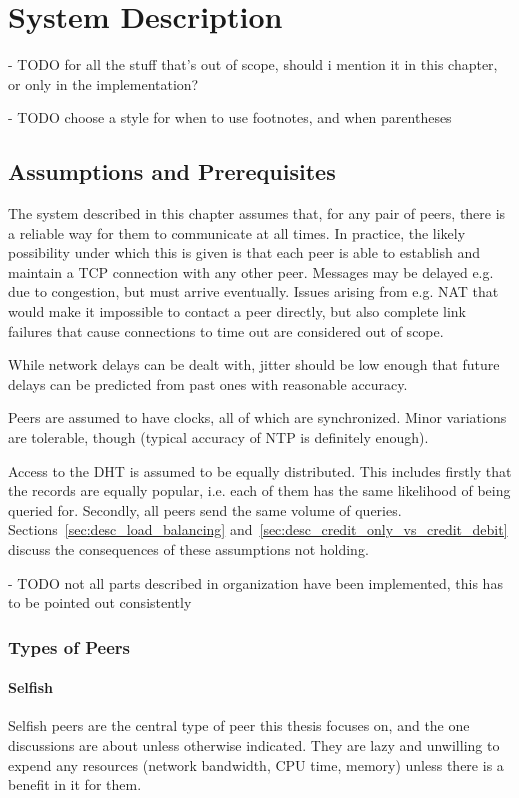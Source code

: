 \chapter{System Description}
- TODO for all the stuff that's out of scope, should i mention it in this
  chapter, or only in the implementation?

- TODO choose a style for when to use footnotes, and when parentheses

\section{Assumptions and Prerequisites}
The system described in this chapter assumes that, for any pair of peers, there
is a reliable way for them to communicate at all times. In practice, the likely
possibility under which this is given is that each peer is able to establish and
maintain a TCP connection with any other peer. Messages may be delayed e.g. due
to congestion, but must arrive eventually. Issues arising from e.g. NAT that
would make it impossible to contact a peer directly, but also complete link
failures that cause connections to time out are considered out of scope.

While network delays can be dealt with, jitter should be low enough that future
delays can be predicted from past ones with reasonable accuracy.

Peers are assumed to have clocks, all of which are synchronized. Minor
variations are tolerable, though (typical accuracy of NTP is definitely enough).

Access to the \ac{DHT} is assumed to be equally distributed. This includes
firstly that the records are equally popular, i.e. each of them has the same
likelihood of being queried for. Secondly, all peers send the same volume of
queries. Sections~\ref{sec:desc_load_balancing}
and~\ref{sec:desc_credit_only_vs_credit_debit} discuss the consequences of these
assumptions not holding.

- TODO not all parts described in organization have been implemented, this has
  to be pointed out consistently

\subsection{Types of Peers}
\subsubsection{Selfish}
Selfish peers are the central type of peer this thesis focuses on, and the one
discussions are about unless otherwise indicated. They are lazy
and unwilling to expend any resources (network bandwidth, CPU time, memory)
unless there is a benefit in it for them.

